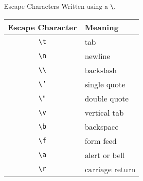 \documentclass[\main/notes.tex]{subfiles}
\begin{document}
			\begin{sidenote}{Escape Characters}
				Written using a \texttt{\textbackslash}.
				\begin{center}
					\begin{tabular}{cl}
						Escape Character & Meaning\\
						\midrule
						\texttt{\textbackslash t} & tab\\
						\texttt{\textbackslash n} & newline\\
						\texttt{\textbackslash \textbackslash} & backslash\\
						\texttt{\textbackslash '} & single quote\\
						\texttt{\textbackslash "} & double quote\\
						\texttt{\textbackslash v} & vertical tab\\
						\texttt{\textbackslash b} & backspace\\
						\texttt{\textbackslash f} & form feed\\
						\texttt{\textbackslash a} & alert or bell\\
						\texttt{\textbackslash r} & carriage return
					\end{tabular}
				\end{center}
			\end{sidenote}
		\pagebreak
\end{document}
